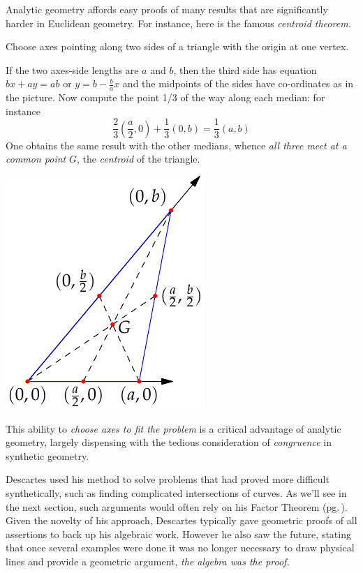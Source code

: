  Analytic geometry affords easy proofs of many results that are significantly harder in Euclidean geometry. For instance, here is the famous \emph{centroid theorem.}
\par
\begin{minipage}[t]{0.68\linewidth}\vspace{-5pt}
	Choose axes pointing along two sides of a triangle with the origin at one vertex.
	\par
	If the two axes-side lengths are $a$ and $b$, then the third side has equation $bx+ay=ab$ or $y=b-\frac bax$ and the midpoints of the sides have co-ordinates as in the picture. Now compute the point 1/3 of the way along each median: for instance
	\[
		\frac 23\left(\frac a2,0\right)+\frac 13(0,b)=\frac 13(a,b)
	\]
	One obtains the same result with the other medians, whence \emph{all three meet at a common point} $G$, the \emph{centroid} of the triangle.
\end{minipage}
\hfill
\begin{minipage}[t]{0.3\linewidth}\vspace{-15pt}
	\flushright\includegraphics{analytic-centroid}
\end{minipage}
\medbreak


This ability to \emph{choose axes to fit the problem} is a critical advantage of analytic geometry, largely dispensing with the tedious consideration of \emph{congruence} in synthetic geometry.

\smallbreak

Descartes used his method to solve problems that had proved more difficult synthetically, such as finding complicated intersections of curves. As we'll see in the next section, such arguments would often rely on his Factor Theorem (pg.\,\pageref{pg:factorthm}). Given the novelty of his approach, Descartes typically gave geometric proofs of all assertions to back up his algebraic work. However he also saw the future, stating that once several examples were done it was no longer necessary to draw physical lines and provide a geometric argument, \emph{the algebra was the proof.}




